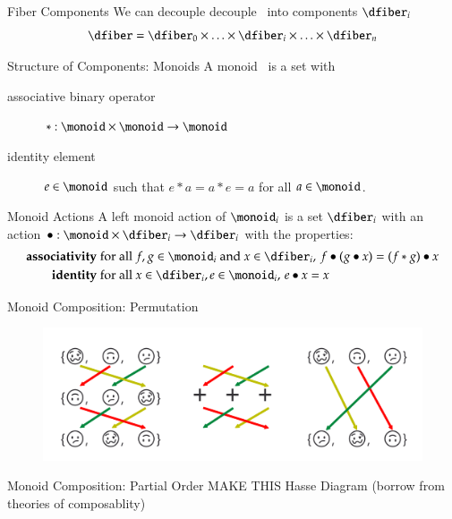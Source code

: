 \documentclass[xcolor={dvipsnames}, handout]{beamer}
\begin{document}
\begin{frame}{Fiber Components}
    We can decouple decouple \dfiber\ into components $\dfiber_i$
    \begin{equation}
        \dfiber= \dfiber_{0} \times \ldots \times \dfiber_{i}\times\ldots\times \dfiber_{n}
    \end{equation}
\end{frame}

\begin{frame}{Structure of Components: Monoids}
A monoid \monoid\ is a set with
\begin{description}
    \item[associative binary operator] $\ast:\monoid \times \monoid\rightarrow \monoid$
    \item[identity element] $e\in \monoid$ such that $e\ast a= a \ast e = a$ for all $a \in \monoid$. 
\end{description}
\end{frame}
\begin{frame}{Monoid Actions}
A left monoid action of $\monoid_i$ is a set $\dfiber_i$ with an action $\bullet: \monoid\times \dfiber_i \rightarrow \dfiber_i$ with the properties:
    \begin{align*}
        \textbf{associativity}\;& \text{for all } f,g \in \monoid_i \text{ and } x\in \dfiber_i,\, f\bullet(g\bullet x) = (f\ast g) \bullet x\\
        \textbf{identity}\;& \text{for all } x\in \dfiber_i, e\in \monoid_i,\,  e\bullet x = x 
    \end{align*}
\end{frame}

\begin{frame}{Monoid Composition: Permutation}
    \begin{figure}
        \includegraphics[width=1\linewidth]{figures/math/monoid_emoji.png}
    \end{figure}
\end{frame}

\begin{frame}{Monoid Composition: Partial Order}
    MAKE THIS Hasse Diagram (borrow from theories of composablity)
\end{frame}
\end{document}
